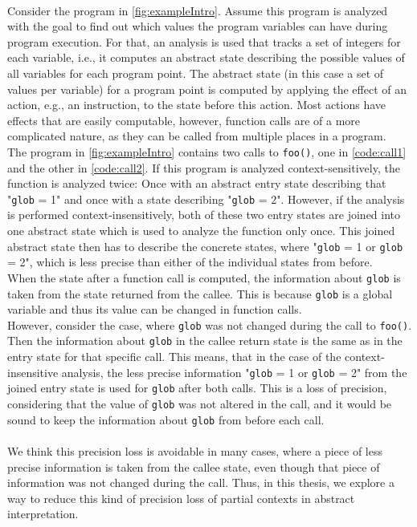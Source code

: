   \\
  Consider the program in \autoref{fig:exampleIntro}. Assume this program is analyzed with the goal to find out which values the program variables can have during program execution. For that, an analysis is used that tracks a set of integers for each variable, i.e., it computes an abstract state describing the possible values of all variables for each program point. The abstract state (in this case a set of values per variable) for a program point is computed by applying the effect of an action, e.g., an instruction, to the state before this action. Most actions have effects that are easily computable, however, function calls are of a more complicated nature, as they can be called from multiple places in a program.\\
  The program in \autoref{fig:exampleIntro} contains two calls to \texttt{foo()}, one in \autoref{code:call1} and the other in \autoref{code:call2}. If this program is analyzed context-sensitively, the function is analyzed twice: Once with an abstract entry state describing that "\texttt{glob} = 1" and once with a state describing "\texttt{glob} = 2". However, if the analysis is performed context-insensitively, both of these two entry states are joined into one abstract state which is used to analyze the function only once. This joined abstract state then has to describe the concrete states, where "\texttt{glob} = 1 or \texttt{glob} = 2", which is less precise than either of the individual states from before.\\
  When the state after a function call is computed, the information about \texttt{glob} is taken from the state returned from the callee. This is because \texttt{glob} is a global variable and thus its value can be changed in function calls.\\
  However, consider the case, where \texttt{glob} was not changed during the call to \texttt{foo()}. Then the information about \texttt{glob} in the callee return state is the same as in the entry state for that specific call. This means, that in the case of the context-insensitive analysis, the less precise information "\texttt{glob} = 1 or \texttt{glob} = 2" from the joined entry state is used for \texttt{glob} after both calls. This is a loss of precision, considering that the value of \texttt{glob} was not altered in the call, and it would be sound to keep the information about \texttt{glob} from before each call.\\
  \\
  We think this precision loss is avoidable in many cases, where a piece of less precise information is taken from the callee state, even though that piece of information was not changed during the call. Thus, in this thesis, we explore a way to reduce this kind of precision loss of partial contexts in abstract interpretation. 

